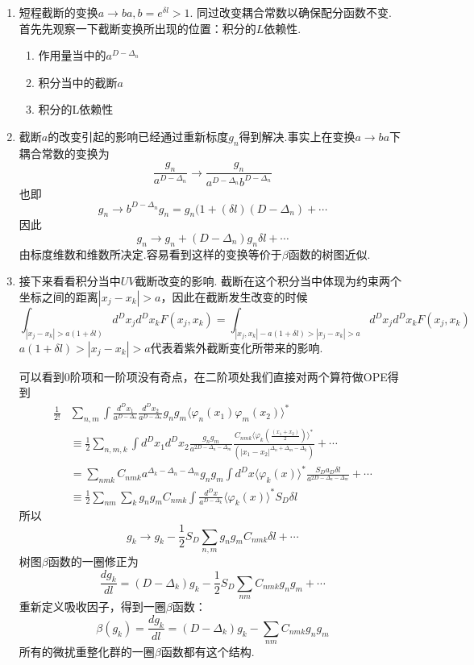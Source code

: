 \documentclass{ctexart}
\begin{document}
\begin{enumerate}
\item 短程截断的变换$a\rightarrow ba,b=e^{\delta l}>1$. 同过改变耦合常数以确保配分函数不变. 
    首先先观察一下截断变换所出现的位置：积分的$L$依赖性.
    \begin{enumerate}
        \item 作用量当中的$a^{D-\Delta_n}$
        \item 积分当中的截断$a$
        \item 积分的L依赖性
    \end{enumerate}
\item 截断$a$的改变引起的影响已经通过重新标度$g_n$得到解决.事实上在变换$a\rightarrow ba$下耦合常数的变换为
    $$\frac{g_n}{a^{D-\Delta_n}}\rightarrow \frac{g_n}{a^{D-\Delta_n}b^{D-\Delta_n}}$$
    也即
    $$g_n\rightarrow b^{D-\Delta_n}g_n=g_n(1+(\delta l)(D-\Delta_n)+\cdots$$
    因此
    $$g_n\rightarrow g_n+(D-\Delta_n)g_n\delta l+\cdots$$
    由标度维数和维数所决定.容易看到这样的变换等价于$\beta$函数的树图近似.\par 
\item 接下来看看积分当中$UV$截断改变的影响. 截断在这个积分当中体现为约束两个坐标之间的距离$|x_j-x_k|>a$，因此在截断发生改变的时候
$$\int_{|x_j-x_k|>a(1+\delta l)}d^Dx_j d^Dx_k F(x_j,x_k)=\int_{|x_j,x_k|-a(1+\delta l)>|x_j-x_k|>a}d^Dx_jd^D x_kF(x_j,x_k)$$
$a(1+\delta l)>|x_j-x_k|>a$代表着紫外截断变化所带来的影响.\par 
可以看到0阶项和一阶项没有奇点，在二阶项处我们直接对两个算符做OPE得到
\begin{align*}
   \frac{1}{2!} & \sum_{n,m}\int \frac{d^Dx_1}{a^{D-\Delta_n}}\frac{d^Dx_2}{a^{D-\Delta_n}}g_ng_m\langle\varphi_n(x_1)\varphi_m(x_2)\rangle^*\\
   & \equiv \frac{1}{2}\sum_{n,m,k}\int d^Dx_1d^Dx_2\frac{g_ng_m}{a^{2D-\Delta_n-\Delta_m}}\frac{C_{nmk}\langle\varphi_k(\frac{(x_1+x_2)}{2})\rangle^*}{(|x_1-x_2|^{\Delta_n+\Delta_m-\Delta_k})}+\cdots\\
   & =\sum_{nmk}C_{nmk}a^{\Delta_k-\Delta_n-\Delta_m}g_ng_m\int d^Dx\langle\varphi_k(x)\rangle^*\frac{S_Da_D\delta l}{a^{2D-\Delta_n-\Delta_m}}+\cdots\\
   & \equiv \frac{1}{2}\sum_{nm}\sum_{k} g_{n}g_{m}C_{nmk}\int\frac{d^Dx}{a^{D-\Delta_k}}\langle\varphi_k(x)\rangle^*S_D\delta l
\end{align*}
所以
$$g_k\rightarrow g_k-\frac{1}{2}S_D\sum_{n,m}g_ng_mC_{nmk}\delta l+\cdots$$
树图$\beta$函数的一圈修正为
$$\frac{dg_k}{dl}=(D-\Delta_k)g_k-\frac{1}{2}S_D\sum_{nm}C_{nmk}g_ng_m+\cdots$$
重新定义吸收因子，得到一圈$\beta$函数：
$$\beta(g_k)=\frac{dg_k}{dl}=(D-\Delta_k)g_k-\sum_{nm}C_{nmk}g_ng_m$$
所有的微扰重整化群的一圈$\beta$函数都有这个结构.
\end{enumerate}
\end{document}
